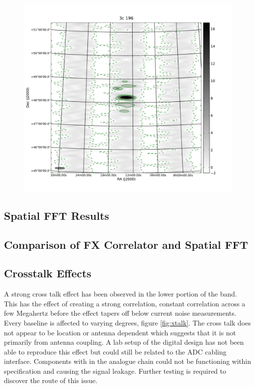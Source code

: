 \documentclass[useAMS,macros,usenatbib,onecolumn]{mn2e}
\begin{document}
\begin{figure}
    \centering
    \includegraphics[scale=0.6]{graphics/3c196_01.pdf}
    \caption{}
    \label{fig:3c196_corr}
\end{figure}

\subsection{Spatial FFT Results}
\label{sfft results}


\subsection{Comparison of FX Correlator and Spatial FFT}



\subsection{Crosstalk Effects}
\label{crosstalk}

A strong cross talk effect has been observed in the lower portion of the band.
This has the effect of creating a strong correlation, constant correlation across a few Megahertz before the effect tapers off below current noise measurements.
Every baseline is affected to varying degrees, figure \ref{fig:xtalk}.
The cross talk does not appear to be location or antenna dependent which suggests that it is not primarily from antenna coupling.
A lab setup of the digital design has not been able to reproduce this effect but could still be related to the ADC cabling interface.
Components with in the analogue chain could not be functioning within specification and causing the signal leakage.
Further testing is required to discover the route of this issue.
\end{document}
